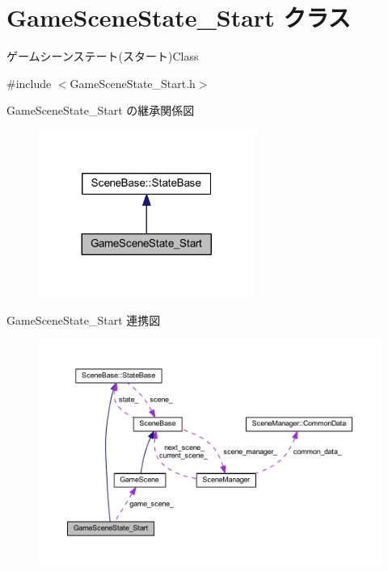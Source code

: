\hypertarget{class_game_scene_state___start}{}\section{Game\+Scene\+State\+\_\+\+Start クラス}
\label{class_game_scene_state___start}


ゲームシーンステート(スタート)Class  




{\ttfamily \#include $<$Game\+Scene\+State\+\_\+\+Start.\+h$>$}



Game\+Scene\+State\+\_\+\+Start の継承関係図
\nopagebreak
\begin{figure}[H]
\begin{center}
\leavevmode
\includegraphics[width=200pt]{class_game_scene_state___start__inherit__graph}
\end{center}
\end{figure}


Game\+Scene\+State\+\_\+\+Start 連携図
\nopagebreak
\begin{figure}[H]
\begin{center}
\leavevmode
\includegraphics[width=350pt]{class_game_scene_state___start__coll__graph}
\end{center}
\end{figure}
